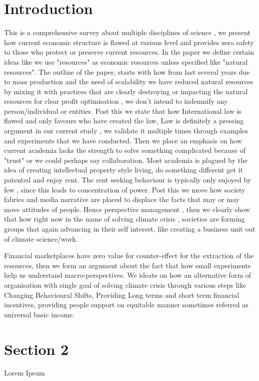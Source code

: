 \documentclass[11pt]{article}
\begin{document}
\maketitle	
\pagebreak



\section{Introduction}

This is a comprehensive survey about multiple disciplines of science , we present how current economic structure is flawed at various level and provides zero safety to those who protect or preserve current resources. In the paper we define certain ideas like we use "resources" as economic resources unless specified like "natural resources". The outline of the paper, starts with how from last several years due to mass production and the need of scalability we have reduced natural resources by mixing it with practices that are clearly destroying or impacting the natural resources for clear profit optimisation , we don't intend to indemnify any person/individual or entities. Post this we state that how International law is flawed and only favours who have created the law, Law is definitely a pressing argument in our current study , we validate it multiple times through examples and experiments that we have conducted. Then we place an emphasis on how current academia lacks the strength to solve something complicated because of "trust" or we could perhaps say collaboration. Most academia is plagued by the idea of creating intellectual property style living, do something different get it patented and enjoy rent. The rent seeking behaviour is typically only enjoyed by few , since this leads to concentration of power. Post this we move how society fabrics and media narrative are placed to displace the facts that may or may move attitudes of people. Hence perspective management , then we clearly show that how right now in the name of solving climate crisis , societies are forming groups that again advancing in their self interest, like creating a business unit out of climate science/work. 

Financial marketplaces have zero value for counter-effect for the extraction of the resources, then we form an argument about the fact that how small experiments help us understand macro-perspectives. We ideate on how an alternative form of organisation with single goal of solving climate crisis through various steps like Changing Behavioural Shifts, Providing Long terms and short term financial incentives, providing people support on equitable manner sometimes referred as universal basic income.


\pagebreak
\section{Section 2}
Lorem Ipsum \\

\end{document}
